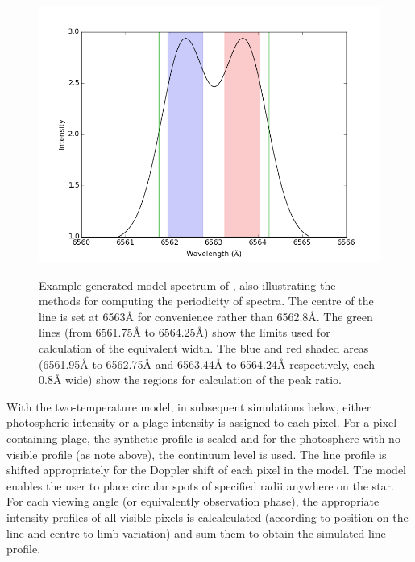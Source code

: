 \begin{figure}[!htbp]
\begin{center}
\includegraphics[scale=0.25]{Figures/integregions.png} \\
\end{center}
\caption{Example generated model spectrum of \prox, also illustrating the methods for computing the periodicity of
  spectra.  The centre of the \ha{} line is set at 6563{\AA} for convenience rather than 6562.8\AA{}.  The green lines
  (from 6561.75{\AA} to 6564.25\AA) show the limits used for calculation of the equivalent width. The blue and red
  shaded areas (6561.95{\AA} to 6562.75{\AA} and 6563.44{\AA} to 6564.24{\AA} respectively, each 0.8{\AA} wide) show the
  regions for calculation of the peak ratio.}
\protect\label{fig:integregions}
\end{figure}

With the two-temperature model, in subsequent simulations below, either photospheric intensity or a plage intensity is
assigned to each pixel. For a pixel containing plage, the synthetic {\ha} profile is scaled and for the photosphere with
no visible profile (as note above), the continuum level is used. The line profile is shifted appropriately for the
Doppler shift of each pixel in the model. The model enables the user to place circular spots of specified radii anywhere
on the star. For each viewing angle (or equivalently observation phase), the appropriate intensity profiles of all
visible pixels is calcalculated (according to position on the line and centre-to-limb variation) and sum them to obtain the simulated line profile.

